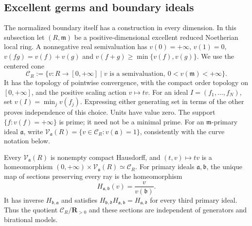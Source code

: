 \subsection{Excellent germs and boundary ideals}
\label{sec:local-excellent-boundary-links}

The normalized boundary itself has a construction in every dimension.
In this subsection let $(R,\mathfrak m)$ be a positive-dimensional
excellent reduced Noetherian local ring. A nonnegative real semivaluation
has $v(0)=+\infty$, $v(1)=0$, $v(fg)=v(f)+v(g)$ and
$v(f+g)\geq\min\{v(f),v(g)\}$. We use the centered cone
\[
 \mathcal C_R
   :=\{v:R\longrightarrow[0,+\infty]\mid
          v\text{ is a semivaluation},\ 0<v(\mathfrak m)<+\infty\}.
\]
It has the topology of pointwise convergence, with the compact order
topology on $[0,+\infty]$, and the positive scaling action $v\mapsto tv$.
For an ideal $I=(f_1,\ldots,f_N)$, set $v(I)=\min_jv(f_j)$.
Expressing either generating set in terms of the other proves independence
of this choice. Units have value zero. The support
$\{f:v(f)=+\infty\}$ is prime; it need not be a minimal prime.
For an $\mathfrak m$-primary ideal $\mathfrak a$, write
$\mathcal V_{\mathfrak a}(R)=\{v\in\mathcal C_R:v(\mathfrak a)=1\}$,
consistently with the curve notation below.

\begin{theorem}\label{thm:p121-excellent-primary-links}
Every $\mathcal V_{\mathfrak a}(R)$ is nonempty compact Hausdorff,
and $(t,v)\mapsto tv$ is a homeomorphism
$(0,+\infty)\times\mathcal V_{\mathfrak a}(R)\simeq\mathcal C_R$.
For primary ideals $\mathfrak a,\mathfrak b$, the unique map of
sections preserving every ray is the homeomorphism
\[
 H_{\mathfrak a,\mathfrak b}(v)=\frac{v}{v(\mathfrak b)}.
\tag{70.7a}\label{eq:p121-general-boundary-change}
\]
It has inverse $H_{\mathfrak b,\mathfrak a}$ and satisfies
$H_{\mathfrak b,\mathfrak d}H_{\mathfrak a,\mathfrak b}
=H_{\mathfrak a,\mathfrak d}$ for every third primary ideal.
Thus the quotient $\mathcal C_R/\mathbf R_{>0}$ and these sections
are independent of generators and birational models.
\end{theorem}

